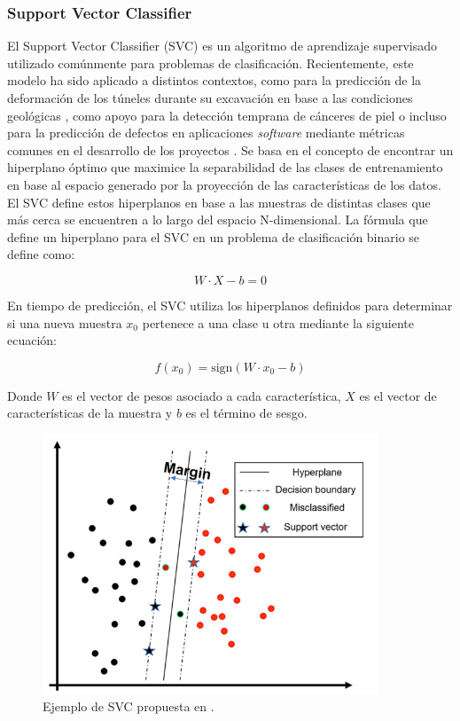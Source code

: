 \documentclass{uathesis-es}
\begin{document}
\subsubsection*{Support Vector Classifier}


El Support Vector Classifier (SVC) es un algoritmo de aprendizaje supervisado utilizado comúnmente para problemas de clasificación. Recientemente, este modelo ha sido aplicado a distintos contextos, como para la predicción de la deformación de los túneles durante su excavación en base a las condiciones geológicas \cite{zhou2022predicting}, como apoyo para la detección temprana de cánceres de piel \cite{arora2022bag} o incluso para la predicción de defectos en aplicaciones \textit{software} mediante métricas comunes en el desarrollo de los proyectos \cite{goyal2022effective}. Se basa en el concepto de encontrar un hiperplano óptimo que maximice la separabilidad de las clases de entrenamiento en base al espacio generado por la proyección de las características de los datos. El SVC define estos hiperplanos en base a las muestras de distintas clases que más cerca se encuentren a lo largo del espacio N-dimensional. La fórmula que define un hiperplano para el SVC en un problema de clasificación binario se define como:

\[
    W \cdot X - b = 0
\]

En tiempo de predicción, el SVC utiliza los hiperplanos definidos para determinar si una nueva muestra $x_0$ pertenece a una clase u otra mediante la siguiente ecuación:

\[
    f({x_0}) = \text{sign}({W} \cdot {x_0} - b)
\]

Donde $W$ es el vector de pesos asociado a cada característica, $X$ es el vector de características de la muestra y $b$ es el término de sesgo.

\begin{figure}[H]
    \centering
    \includegraphics[width=10cm]{Figures/Background/SVC.png}
    \caption{Ejemplo de SVC propuesta en \cite{MISRA2020243}.}
    \label{GA_inicializacion}
\end{figure}
\end{document}
